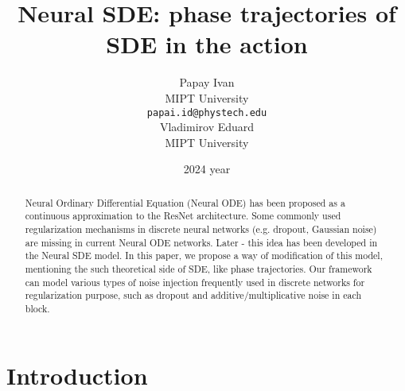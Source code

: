 \documentclass{article}
\title{Neural SDE: phase trajectories of SDE in the action}
\author{ Papay Ivan\\
	MIPT University \\
	\texttt{papai.id@phystech.edu} \\
	\And
	Vladimirov Eduard \\
	MIPT University\\
}
\date{2024 year}
\begin{document}
\maketitle

\begin{abstract}
   Neural Ordinary Differential Equation (Neural ODE) has been proposed as a continuous
approximation to the ResNet architecture. Some commonly used regularization mechanisms
in discrete neural networks (e.g. dropout, Gaussian noise) are missing in current Neural ODE
networks. Later - this idea has been developed in the Neural SDE model. In this paper, we propose a way of modification of this model, mentioning the such theoretical side of SDE, like phase trajectories. Our framework
can model various types of noise injection frequently used in discrete networks for regularization purpose, such as dropout and additive/multiplicative noise in each block. 
\end{abstract}



\section{Introduction}
\end{document}
